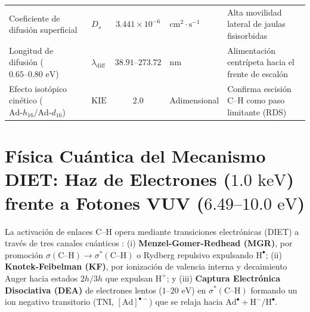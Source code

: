\documentclass[10pt,twocolumn,a4paper]{article}
\begin{document}
\begin{table}[t]
{\begin{tabular}{@{}llcll@{}}
Coeficiente de difusión superficial & $D_s$ & $3.441 \times 10^{-6}$ & $\text{cm}^2\cdot\text{s}^{-1}$ & Alta movilidad lateral de jaulas fisisorbidas \\
Longitud de difusión ($0.65\text{--}0.80\text{ eV}$) & $\lambda_{\text{diff}}$ & $38.91\text{--}273.72$ & $\text{nm}$ & Alimentación centrípeta hacia el frente de escalón \\
Efecto isotópico cinético ($\text{Ad-}h_{16}/\text{Ad-}d_{16}$) & $\text{KIE}$ & $2.0$ & Adimensional & Confirma escisión $\text{C--H}$ como paso limitante (RDS) \\ \bottomrule
\end{tabular}%
}
\end{table}

\section{Física Cuántica del Mecanismo DIET: Haz de Electrones ($1.0\text{ keV}$) frente a Fotones VUV ($6.49\text{--}10.0\text{ eV}$)}

La activación de enlaces $\text{C--H}$ opera mediante transiciones electrónicas (DIET) a través de tres canales cuánticos \cite{Menzel1964,Avouris1984}: (i) \textbf{Menzel-Gomer-Redhead (MGR)}, por promoción $\sigma(\text{C--H}) \to \sigma^*(\text{C--H})$ o Rydberg repulsivo expulsando $\text{H}^\bullet$; (ii) \textbf{Knotek-Feibelman (KF)}, por ionización de valencia interna y decaimiento Auger hacia estados $2h/3h$ que expulsan $\text{H}^+$; y (iii) \textbf{Captura Electrónica Disociativa (DEA)} de electrones lentos ($1\text{--}20\text{ eV}$) en $\sigma^*(\text{C--H})$ formando un ion negativo transitorio ($\text{TNI}$, $[\text{Ad}]^{\bullet-}$) que se relaja hacia $\text{Ad}^\bullet + \text{H}^-/\text{H}^\bullet$.
\end{document}
